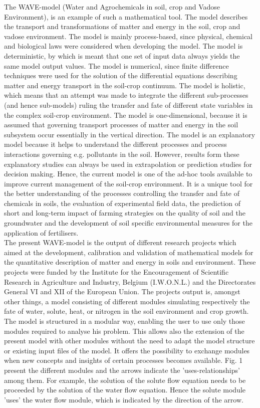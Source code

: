 The WAVE-model (Water and Agrochemicals in soil, crop and Vadose Environment), is an example of such a mathematical tool. The model describes the transport and transformations of matter and energy in the soil, crop and vadose environment. The model is mainly process-based, since physical, chemical and biological laws were considered when developing the model. The model is deterministic, by which is meant that one set of input data always yields the same model output values. The model is numerical, since finite difference techniques were used for the solution of the differential equations describing matter and energy transport in the soil-crop continuum. The model is holistic, which means that an attempt was made to integrate the different sub-processes (and hence sub-models) ruling the transfer and fate of different state variables in the complex soil-crop environment. The model is one-dimensional, because it is assumed that governing transport processes of matter and energy in the soil subsystem occur essentially in the vertical direction. The model is an explanatory model because it helps to understand the different processes and process interactions governing e.g. pollutants in the soil. However, results form these explanatory studies can always be used in extrapolation or prediction studies for decision making. Hence, the current model is one of the ad-hoc tools available to improve current management of the soil-crop environment. It is a unique tool for the better understanding of the processes controlling the transfer and fate of chemicals in soils, the evaluation of experimental field data, the prediction of short and long-term impact of farming strategies on the quality of soil and the groundwater and the development of soil specific environmental measures for the application of fertilisers.\\

The present WAVE-model is the output of different research projects which aimed at the development, calibration and validation of mathematical models for the quantitative description of matter and energy in soils and environment. These projects were funded by the Institute for the Encouragement of Scientific Research in Agriculture and Industry, Belgium (I.W.O.N.L.) and the Directorates General VI and XII of the European Union. The projects output is, amongst other things, a model consisting of different modules simulating respectively the fate of water, solute, heat, or nitrogen in the soil environment and crop growth. The model is structured in a modular way, enabling the user to use only those modules required to analyse his problem. This allows also the extension of the present model with other modules without the need to adapt the model structure or existing input files of the model. It offers the possibility to exchange modules when new concepts and insights of certain processes becomes available. Fig. 1 present the different modules and the arrows indicate the 'uses-relationships' among them. For example, the solution of the solute flow equation needs to be proceeded by the solution of the water flow equation. Hence the solute module 'uses' the water flow module, which is indicated by the direction of the arrow.\\


